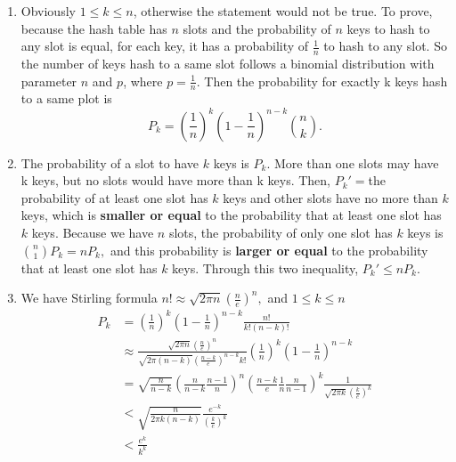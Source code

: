 \documentclass{assignment}
\begin{document}
    \begin{homeworkProblem}
	\begin{enumerate}
	\item
	Obviously $1 \leq k \leq n$, otherwise the statement would not be true. To prove, because the hash table has $n$ slots and the probability of $n$ keys to hash to any slot is equal, for each key, it has a probability of $\frac{1}{n}$ to hash to any slot. So the number of keys hash to a same slot follows a binomial distribution with parameter $n$ and $p$, where $p=\frac{1}{n}$. Then the probability for exactly k keys hash to a same plot is $$P_k = \left(\frac{1}{n}\right)^k \left(1-\frac{1}{n}\right)^{n-k} \binom n k.$$
	\item The probability of a slot to have $k$ keys is $P_k$. More than one slots may have k keys, but no slots would have more than k keys. Then, $P_k' = $the probability of at least one slot has $k$ keys and other slots have no more than $k$ keys, which is \textbf{smaller or equal} to the probability that at least one slot has $k$ keys. Because we have $n$ slots, the probability of only one slot has $k$ keys is $\binom n 1 P_k = nP_k,$ and this probability is \textbf{larger or equal} to the probability that at least one slot has $k$ keys. Through this two inequality, $P_k' \leq nP_k$.
	\item We have Stirling formula $n! \approx \sqrt{2\pi n}\left(\frac{n}{e}\right)^n,$ and $1 \leq k\leq n$
		\begin{equation*}
	\begin{aligned}
	P_k &= \left(\frac{1}{n}\right)^k \left(1-\frac{1}{n}\right)^{n-k} \frac{n!}{k!(n-k)!} \\
	&\approx \frac{\sqrt{2 \pi n}\left(\frac{n}{e}\right)^n}{\sqrt{2 \pi (n-k)}\left(\frac{n-k}{e}\right)^{n-k}k!} \left(\frac{1}{n}\right)^k \left(1-\frac{1}{n}\right)^{n-k} \\
	&=\sqrt{ \frac{n}{n-k}} \left(\frac{n}{n-k} \frac{n-1}{n}\right)^n \left(\frac{n-k}{e} \frac{1}{n}\frac{n}{n-1}\right)^{k} \frac{1}{\sqrt{2 \pi k}\left(\frac{k}{e}\right)^k} \\
	& < \sqrt{ \frac{n}{2 \pi k(n-k)}}   \frac{e^{-k}}{\left(\frac{k}{e}\right)^k} \\
	&< \frac{e^k}{k^k}
	\end{aligned}
	\end{equation*}
	
	
	
	\end{enumerate}
    	
    \end{homeworkProblem}
    
\end{document}
